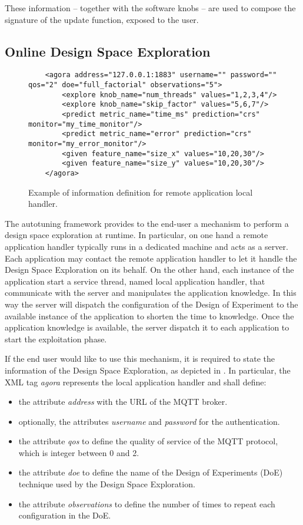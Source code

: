 These information -- together with the software knobs --  are used to compose the signature of the update function, exposed to the user.



\subsection{Online Design Space Exploration}


\begin{figure}
	\lstset{language=XML}
	\begin{lstlisting}
	<agora address="127.0.0.1:1883" username="" password="" qos="2" doe="full_factorial" observations="5">
		<explore knob_name="num_threads" values="1,2,3,4"/>
		<explore knob_name="skip_factor" values="5,6,7"/>
		<predict metric_name="time_ms" prediction="crs" monitor="my_time_monitor"/>
		<predict metric_name="error" prediction="crs" monitor="my_error_monitor"/>
		<given feature_name="size_x" values="10,20,30"/>
		<given feature_name="size_y" values="10,20,30"/>
	</agora>
	\end{lstlisting}
	\caption{Example of information definition for remote application local handler.}
	\label{code:agora_xml}
\end{figure}

The autotuning framework provides to the end-user a mechanism to perform a design space exploration at runtime.
In particular, on one hand a remote application handler typically runs in a dedicated machine and acts as a server.
Each application may contact the remote application handler to let it handle the Design Space Exploration on its behalf.
On the other hand, each instance of the application start a service thread, named local application handler, that communicate with the server and manipulates the application knowledge.
In this way the server will dispatch the configuration of the Design of Experiment to the available instance of the application to shorten the time to knowledge.
Once the application knowledge is available, the server dispatch it to each application to start the exploitation phase.

If the end user would like to use this mechanism, it is required to state the information of the Design Space Exploration, as depicted in .
In particular, the XML tag \textit{agora} represents the local application handler and shall define:
\begin{itemize}
	\item the attribute \textit{address} with the URL of the MQTT broker.
	\item optionally, the attributes \textit{username} and \textit{password} for the authentication.
	\item the attribute \textit{qos} to define the quality of service of the MQTT protocol, which is integer between 0 and 2.
	\item the attribute \textit{doe} to define the name of the Design of Experiments (DoE) technique used by the Design Space Exploration.
	\item the attribute \textit{observations} to define the number of times to repeat each configuration in the DoE.
\end{itemize}


